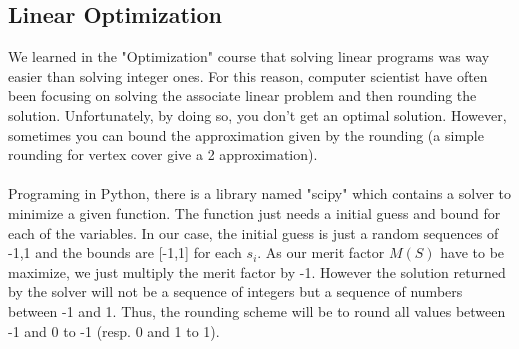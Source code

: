 \documentclass[a4paper,11pt,openany]{article}
\begin{document}
\subsection{Linear Optimization}
\label{linear_optim}
We learned in the "Optimization" course that solving linear programs was way easier than solving integer ones. For this reason, computer scientist have often been focusing on solving the associate linear problem and then rounding the solution. Unfortunately, by doing so, you don't get an optimal solution. However, sometimes you can bound the approximation given by the rounding (a simple rounding for vertex cover give a 2 approximation).\\\\
Programing in Python, there is a library named "scipy" which contains a solver to minimize a given function. The function just needs a initial guess and bound for each of the variables. In our case, the initial guess is just a random sequences of {-1,1} and the bounds are [-1,1] for each $s_i$. As our merit factor $M(S)$ have to be maximize, we just multiply the merit factor by -1. However the solution returned by the solver will not be a sequence of integers but a sequence of numbers between -1 and 1. Thus, the rounding scheme will be to round all values between -1 and 0 to -1 (resp. 0 and 1 to 1). \\\\
\end{document}
